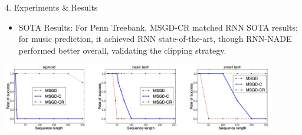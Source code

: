 \documentclass[final]{beamer}
\begin{document}
\begin{frame}[t]
\begin{columns}[t,totalwidth=\textwidth]
\begin{column}{0.35\textwidth}
\begin{block}{4. Experiments \& Results}
{\begin{itemize}
    \item SOTA Results: For Penn Treebank, MSGD-CR matched RNN SOTA results; for music prediction, it achieved RNN state-of-the-art, though RNN-NADE performed better overall, validating the clipping strategy. 
  \end{itemize}}  %
  \vspace{0.5cm}
\begin{center}
  \includegraphics[width=0.9\textwidth]{figures/results.png}
\end{center}
 \vspace{0.5cm}



    \end{block}

  

\end{column}
\end{columns}
\end{frame}
\end{document}
